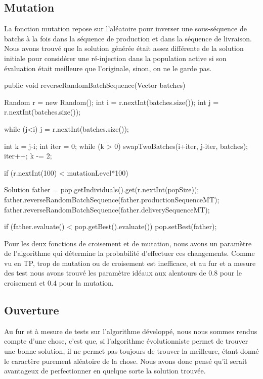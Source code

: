 \subsection{Mutation}
La fonction mutation repose sur l'aléatoire pour inverser une sous-séquence de batchs à la fois dans la séquence de production et dans la séquence de livraison. Nous avons trouvé que la solution générée était assez différente de la solution initiale pour considérer une ré-injection dans la population active si son évaluation était meilleure que l'originale, sinon, on ne le garde pas.
\begin{java}
public void reverseRandomBatchSequence(Vector batches) {
	Random r = new Random();
	int i = r.nextInt(batches.size());
	int j = r.nextInt(batches.size());
	
	while (j<i)
		j = r.nextInt(batches.size());
	
	int k = j-i;
	int iter = 0;
	while (k > 0) {
		swapTwoBatches(i+iter, j-iter, batches);
		iter++;
		k -= 2;
	}
}
\end{java}

\vspace{1em}

\begin{java}
if (r.nextInt(100) < mutationLevel*100) {			
	Solution father = pop.getIndividuals().get(r.nextInt(popSize));
	father.reverseRandomBatchSequence(father.productionSequenceMT);
	father.reverseRandomBatchSequence(father.deliverySequenceMT);
	
	if (father.evaluate() < pop.getBest().evaluate()) 
		pop.setBest(father);
		
}
\end{java}

Pour les deux fonctions de croisement et de mutation, nous avons un paramètre de l'algorithme qui détermine la probabilité d'effectuer ces changements. Comme vu en TP, trop de mutation ou de croisement est inefficace, et au fur et a mesure des test nous avons trouvé les paramètre idéaux aux alentours de 0.8 pour le croisement et 0.4 pour la mutation.

\subsection{Ouverture}
Au fur et à mesure de tests sur l'algorithme développé, nous nous sommes rendus compte d'une chose, c'est que, si l'algorithme évolutionniste permet de trouver une bonne solution, il ne permet pas toujours de trouver la meilleure, étant donné le caractère purement aléatoire de la chose. Nous avons donc pensé qu'il serait avantageux de perfectionner en quelque sorte la solution trouvée.